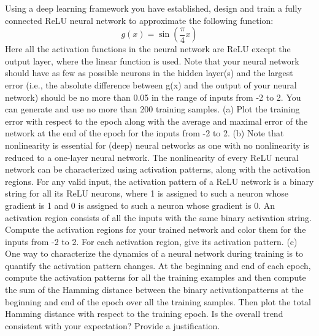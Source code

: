 \documentclass[
	12pt, %
]{../Template/fphw}
\begin{document}
\begin{problem}
Using a deep learning framework you have established, design and train a fully connected
ReLU neural network to approximate the following function:
\begin{equation}
    g(x) = \sin\left(\frac{\pi}{4}x\right)
\end{equation}
Here all the activation functions in the neural network are ReLU except the output layer, where the linear function
is used. Note that your neural network should have as few as possible neurons in the hidden layer(s) and the
largest error (i.e., the absolute difference between g(x) and the output of your neural network) should be no more
than 0.05 in the range of inputs from -2 to 2. You can generate and use no more than 200 training samples.
(a) Plot the training error with respect to the epoch along with the average and maximal error of the network
at the end of the epoch for the inputs from -2 to 2.
(b) Note that nonlinearity is essential for (deep) neural networks as one with no nonlinearity is reduced to a
one-layer neural network. The nonlinearity of every ReLU neural network can be characterized using
activation patterns, along with the activation regions. For any valid input, the activation pattern of a ReLU
network is a binary string for all its ReLU neurons, where 1 is assigned to such a neuron whose gradient is
1 and 0 is assigned to such a neuron whose gradient is 0. An activation region consists of all the inputs
with the same binary activation string. Compute the activation regions for your trained network and color
them for the inputs from -2 to 2. For each activation region, give its activation pattern.
(c) One way to characterize the dynamics of a neural network during training is to quantify the activation
pattern changes. At the beginning and end of each epoch, compute the activation patterns for all the
training examples and then compute the sum of the Hamming distance between the binary activationpatterns at the beginning and end of the epoch over all the training samples. Then plot the total Hamming
distance with respect to the training epoch. Is the overall trend consistent with your expectation? Provide a
justification.
\end{problem}

\end{document}
